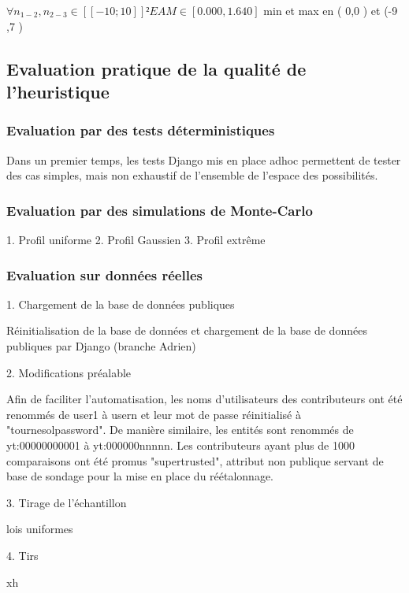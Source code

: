 $\forall{n_{1-2},n_{2-3}}\in [\![-10;10]\!]²  EAM \in [0.000,1.640 ]$ 
min et max en ( 0,0 ) et  (-9 ,7 )

\subsection{Evaluation pratique de la qualité de l'heuristique}
\subsubsection{Evaluation par des tests déterministiques}

Dans un premier temps, les tests Django mis en place adhoc permettent de tester des cas simples, mais non exhaustif de l'ensemble de l'espace des possibilités.

\subsubsection{Evaluation par des simulations de Monte-Carlo}

1. Profil uniforme
2. Profil Gaussien
3. Profil extrême
\subsubsection{Evaluation sur données réelles}

1. Chargement de la base de données publiques

Réinitialisation de la base de données et chargement de la base de données publiques par Django (branche Adrien)

2. Modifications préalable

Afin de faciliter l'automatisation, les noms d'utilisateurs des contributeurs ont été renommés de user1 à usern et leur mot de passe réinitialisé à "tournesolpassword". De manière similaire, les entités sont renommés de yt:00000000001 à yt:000000nnnnn. Les contributeurs ayant plus de 1000 comparaisons ont été promus "supertrusted", attribut non publique servant de base de sondage pour la mise en place du réétalonnage.

3. Tirage de l'échantillon

lois uniformes

4. Tirs

xh

\pagebreak